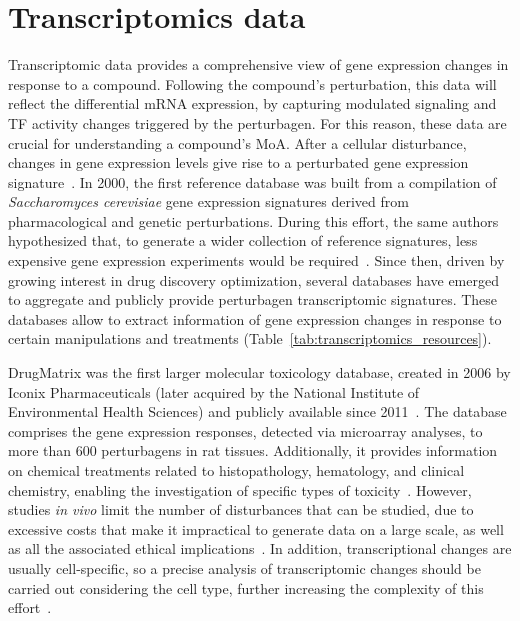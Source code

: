 \section{Transcriptomics data}
\label{sec:Transcriptomics_data}

Transcriptomic data provides a comprehensive view of gene expression changes in response to a compound. 
Following the compound's perturbation, this data will reflect the differential mRNA expression, by capturing modulated signaling and \gls{TF} activity changes triggered by the perturbagen. 
For this reason, these data are crucial for understanding a compound's \gls{MoA}. 
After a cellular disturbance, changes in gene expression levels give rise to a perturbated gene expression signature~\cite{RN114}. 
In 2000, the first reference database was built from a compilation of \textit{Saccharomyces cerevisiae} gene expression signatures derived from pharmacological and genetic perturbations. 
During this effort, the same authors hypothesized that, to generate a wider collection of reference signatures, less expensive gene expression experiments would be required~\cite{RN115, RN116, RN117}. 
Since then, driven by growing interest in drug discovery optimization, several databases have emerged to aggregate and publicly provide perturbagen transcriptomic signatures. 
These databases allow to extract information of gene expression changes in response to certain manipulations and treatments (Table~\ref{tab:transcriptomics_resources}).


DrugMatrix was the first larger molecular toxicology database, created in 2006 by Iconix Pharmaceuticals (later acquired by the National Institute of Environmental Health Sciences) and publicly available since 2011~\cite{RN115, RN118, RN119}. 
The database comprises the gene expression responses, detected via microarray analyses, to more than 600 perturbagens in rat tissues. 
Additionally, it provides information on chemical treatments related to histopathology, hematology, and clinical chemistry, enabling the investigation of specific types of toxicity~\cite{RN121}. 
However, studies \textit{in vivo} limit the number of disturbances that can be studied, due to excessive costs that make it impractical to generate data on a large scale, as well as all the associated ethical implications~\cite{RN145}. 
In addition, transcriptional changes are usually cell-specific, so a precise analysis of transcriptomic changes should be carried out considering the cell type, further increasing the complexity of this effort~\cite{RN86}.


